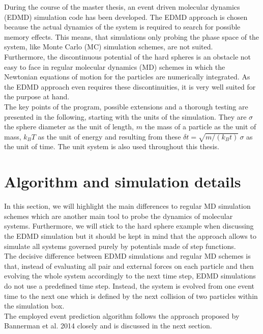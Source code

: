 
\label{chp:simulation}
During the course of the master thesis, an event driven molecular dynamics (EDMD) simulation code has been developed. The EDMD approach is chosen because the actual dynamics of the system is required to search for possible memory effects. This means, that simulations only probing the phase space of the system, like Monte Carlo (MC) simulation schemes, are not suited.\\ 
Furthermore, the discontinuous potential of the hard spheres is an obstacle not easy to face in regular molecular dynamics (MD) schemes in which the Newtonian equations of motion for the particles are numerically integrated. As the EDMD approach even requires these discontinuities, it is very well suited for the purpose at hand.\\ 
The key points of the program, possible extensions and a thorough testing are presented in the following, starting with the units of the simulation. They are $\sigma$ the sphere diameter as the unit of length, $m$ the mass of a particle as the unit of mass, $k_B T$ as the unit of energy and resulting from these $\delta t = \sqrt{m / (k_B t)} \, \sigma$ as the unit of time. The unit system is also used throughout this thesis.

\section{Algorithm and simulation details}
\label{sec:simulation}
In this section, we will highlight the main differences to regular MD simulation schemes which are another main tool to probe the dynamics of molecular systems. Furthermore, we will stick to the hard sphere example when discussing the EDMD simulation but it should be kept in mind that the approach allows to simulate all systems governed purely by potentials made of step functions.\\
 
The decisive difference between EDMD simulations and regular MD schemes is that, instead of evaluating all pair and external forces on each particle and then evolving the whole system accordingly to the next time step, EDMD simulations do not use a predefined time step. Instead, the system is evolved from one event time to the next one which is defined by the next collision of two particles within the simulation box.\\

The employed event prediction algorithm follows the approach proposed by Bannerman et al. 2014\cite{Bannerman2014} closely and is discussed in the next section.

